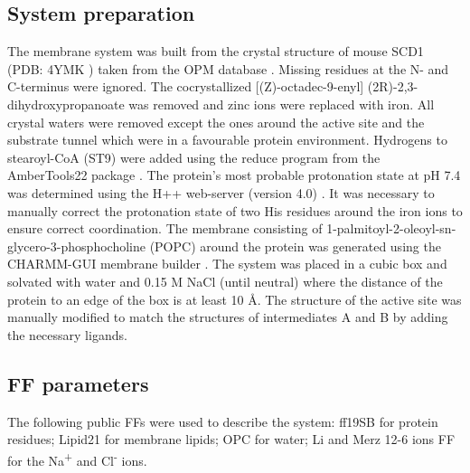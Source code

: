 \subsection{System preparation}
The membrane system was built from the crystal structure of mouse SCD1 (PDB: 4YMK \cite{Bai2015}) taken from the OPM database \cite{Lomize2012}. Missing residues at the N- and C-terminus were ignored. The cocrystallized [(Z)-octadec-9-enyl] (2R)-2,3-dihydroxypro\-pa\-noate was removed and zinc ions were replaced with iron. All crystal waters were removed except the ones around the active site and the substrate tunnel which were in a favourable protein environment. Hydrogens to stearoyl-CoA (ST9) were added using the reduce program from the AmberTools22 package \cite{ambertools22}. The protein's most probable protonation state at pH 7.4 was determined using the H++ web-server (version 4.0) \cite{H++,Myers2006,Gordon2005,Anandakrishnan2012}. It was necessary to manually correct the protonation state of two His residues around the iron ions to ensure correct coordination. The membrane consisting of 1-palmitoyl-2-oleoyl-sn-glycero-3-phosphocholine (POPC) around the protein was generated using the CHARMM-GUI membrane builder \cite{Jo2008}. The system was placed in a cubic box and solvated with water and 0.15 M NaCl (until neutral) where the distance of the protein to an edge of the box is at least 10 Å. The structure of the active site was manually modified to match the structures of intermediates A and B by adding the necessary ligands. 

\subsection{FF parameters}
The following public FFs were used to describe the system: ff19SB \cite{Tian2020} for protein residues; Lipid21 for membrane lipids; OPC \cite{Xiong2020} for water; Li and Merz 12-6 ions FF \cite{Sengupta2021} for the Na\textsuperscript{+} and Cl\textsuperscript{-} ions. 

